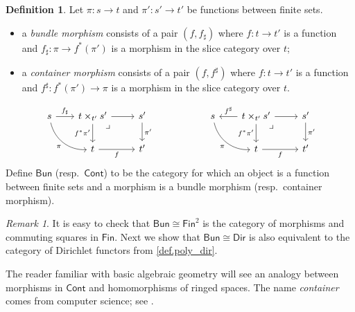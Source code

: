 \documentclass[11pt, article, one side]{memoir}
\theoremstyle{theorem}
\theoremstyle{definition}
\newtheorem{definition}[equation]{Definition}
\theoremstyle{remark}
\newtheorem{remark}[equation]{Remark}
\newcommand{\Cat}[1]{\mathsf{#1}}%
\newcommand{\finset}{\Cat{Fin}}
\newcommand{\cont}{\Cat{Cont}}
\newcommand{\bun}{\Cat{Bun}}
\newcommand{\dir}{\Cat{Dir}}
\begin{document}
\begin{definition}\label{def.sheaves_bundles}
Let $\pi\colon s\to t$ and $\pi'\colon s'\to t'$ be functions between finite sets.
\begin{itemize}
	\item a \emph{bundle morphism} consists of a pair $(f,f_\sharp)$ where $f\colon t\to t'$ is a function and $f_\sharp\colon \pi\to f^*(\pi')$ is a morphism in the slice category over $t$;
	\item a \emph{container morphism} consists of a pair $(f,f^\sharp)$ where $f\colon t\to t'$ is a function and $f^\sharp\colon f^*(\pi')\to \pi$ is a morphism in the slice category over $t$.
\end{itemize}
\begin{equation}\label{eqn.bund_cont_maps}
\begin{tikzcd}
s\ar[dr, bend right=40pt, "\pi"']&[-5pt]
t\times_{t'}s'\ar[r]\ar[d, "f^*\pi'"']\ar[from=l, "f_\sharp"]&
s'\ar[d, "\pi'"]\\&
t\ar[r, "f"']&
t'\ar[ul, phantom, very near end, "\lrcorner"]
\end{tikzcd}
\hspace{.75in}
\begin{tikzcd}
s\ar[dr, bend right=40pt, "\pi"']&[-5pt]
t\times_{t'}s'\ar[r]\ar[d, "f^*\pi'"']\ar[l, "f^\sharp"']&
s'\ar[d, "\pi'"]\\&
t\ar[r, "f"']&
t'\ar[ul, phantom, very near end, "\lrcorner"]
\end{tikzcd}
\end{equation}
Define $\bun$ (resp.\ $\cont$) to be the category for which an object is a function between finite sets and a morphism is a bundle morphism (resp.\ container morphism).
\end{definition}

\begin{remark}\label{rem.dir_fin2}
It is easy to check that $\bun\cong\finset^2$ is the category of morphisms and commuting squares in $\finset$. Next we show that $\bun\cong\dir$ is also equivalent to the category of Dirichlet functors from \cref{def.poly_dir}.

The reader familiar with basic algebraic geometry will see an analogy between morphisms in $\cont$ and homomorphisms of ringed spaces. The name \emph{container} comes from computer science; see \cite{**}.
\end{remark}
\end{document}
